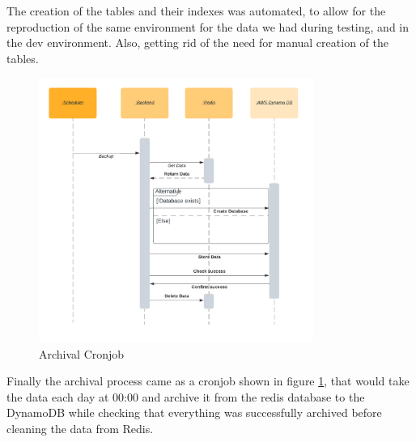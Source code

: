 The creation of the tables and their indexes was automated, to allow for the
reproduction of the same environment for the data we had during testing, and in the 
dev environment. Also, getting rid of the need for manual creation of the tables.

\begin{figure}[!htb]
    \centering
    \includegraphics[width=0.8\textwidth]{images/archival_backup.png} 
    \caption{\footnotesize{Archival Cronjob}}
    \label{fig:archival_backup}
\end{figure}

Finally the archival process came as a cronjob shown in figure \ref{fig:archival_backup},
that would take the data each day at 00:00 and archive it from the redis database to the
DynamoDB while checking that everything was successfully archived before cleaning the data
from Redis.

